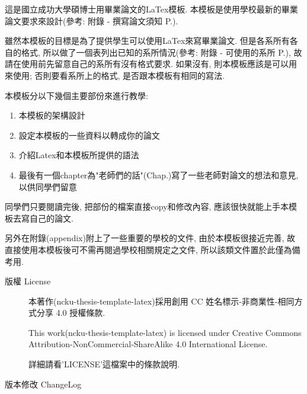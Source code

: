 

這是國立成功大學碩博士用畢業論文的LaTex模板. 本模板是使用學校最新的畢業論文要求來設計(參考: 附錄 - 撰寫論文須知 P.).

雖然本模板的目標是為了提供學生可以使用LaTex來寫畢業論文. 但是各系所有各自的格式, 所以做了一個表列出已知的系所情況(參考: 附錄 - 可使用的系所 P.), 故請在使用前先留意自己的系所有沒有格式要求. 如果沒有, 則本模板應該是可以用來使用; 否則要看系所上的格式, 是否跟本模板有相同的寫法.

本模板分以下幾個主要部份來進行教學:
\begin{enumerate}
  \item 本模板的架構設計
  \item 設定本模板的一些資料以轉成你的論文
  \item 介紹Latex和本模板所提供的語法
  \item 最後有一個chapter為"老師們的話"(Chap.)寫了一些老師對論文的想法和意見, 以供同學們留意
\end{enumerate}
同學們只要閱讀完後, 把部份的檔案直接copy和修改內容, 應該很快就能上手本模板去寫自己的論文.

另外在附錄(appendix)附上了一些重要的學校的文件, 由於本模板很接近完善, 故直接使用本模板後可不需再閱過學校相關規定之文件, 所以該類文件置於此僅為備考用.

\newpage

\begin{description}
  \item[版權 License] \hfill

    本著作(ncku-thesis-template-latex)採用創用 CC 姓名標示-非商業性-相同方式分享 4.0 授權條款.

    This work(ncku-thesis-template-latex) is licensed under Creative Commons Attribution-NonCommercial-ShareAlike 4.0 International License.

  詳細請看'LICENSE'這檔案中的條款說明.

  \item[版本修改 ChangeLog] \hfill
    
\end{description}

\EndChapter
